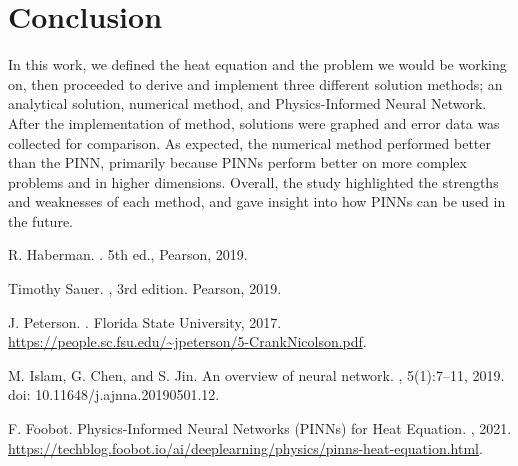 \documentclass[12pt, reqno]{amsart}
\begin{document}
\section{Conclusion}
In this work, we defined the heat equation and the problem we would be working on, then proceeded to derive and implement three different solution methods; an analytical solution, numerical method, and Physics-Informed Neural Network. After the implementation of method, solutions were graphed and error data was collected for comparison. As expected, the numerical method performed better than the PINN, primarily because PINNs perform better on more complex problems and in higher dimensions. Overall, the study highlighted the strengths and weaknesses of each method, and gave insight into how PINNs can be used in the future.

\begin{thebibliography}{10}
R. Haberman.
.
\newblock 5th ed., Pearson, 2019.

Timothy Sauer.
, 3rd edition.
\newblock Pearson, 2019.



J. Peterson.
.
\newblock Florida State University, 2017.
\newblock \url{https://people.sc.fsu.edu/~jpeterson/5-CrankNicolson.pdf}.




M. Islam, G. Chen, and S. Jin.
\newblock An overview of neural network.
, 5(1):7--11, 2019.
\newblock doi: 10.11648/j.ajnna.20190501.12.


F. Foobot.
\newblock Physics-Informed Neural Networks (PINNs) for Heat Equation.
, 2021.
\newblock \url{https://techblog.foobot.io/ai/deeplearning/physics/pinns-heat-equation.html}.


\end{thebibliography}
\end{document}
